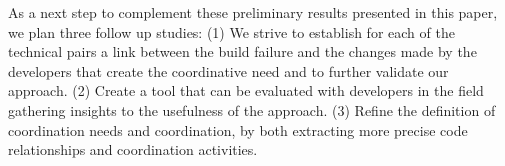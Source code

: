 \documentclass[conference]{IEEEtran}
\begin{document}
As a next step to complement these preliminary results presented in this paper, we plan three follow up studies:
(1) We strive to establish for each of the technical pairs a link between the build failure and the changes made by the developers that create the coordinative need and to further validate our approach.
(2) Create a tool that can be evaluated with developers in the field gathering insights to the usefulness of the approach.
(3) Refine the definition of coordination needs and coordination, by both extracting more precise code relationships and coordination activities.



\end{document}
